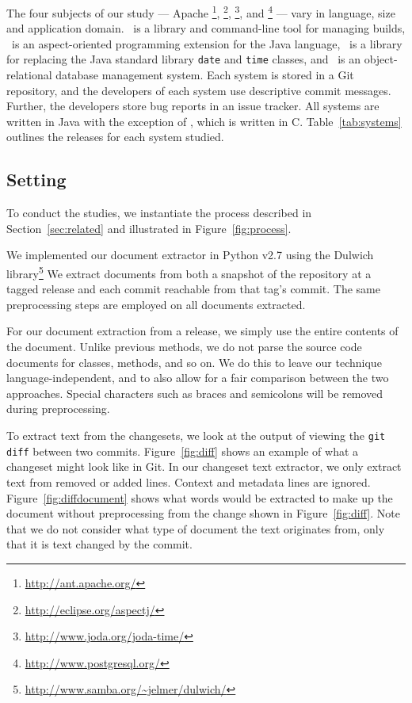 The four subjects of our study ---
Apache \ant\footnote{\url{http://ant.apache.org/}},
\aspectj\footnote{\url{http://eclipse.org/aspectj/}},
\jodatime\footnote{\url{http://www.joda.org/joda-time/}},
and \postgres\footnote{\url{http://www.postgresql.org/}}
--- vary in language, size and application domain.
\ant\ is a library and command-line tool for managing builds,
\aspectj\ is an aspect-oriented programming extension for the Java language,
\jodatime\ is a library for replacing the Java standard library \texttt{date} and \texttt{time} classes,
and \postgres\ is an object-relational database management system.
Each system is stored in a Git repository, and the developers of each system use descriptive commit messages.
Further, the developers store bug reports in an issue tracker.
All systems are written in Java with the exception of \postgres,
which is written in C. Table~\ref{tab:systems} outlines the releases for
each system studied.


\subsection{Setting}

To conduct the studies, we instantiate the process described in Section~\ref{sec:related} and illustrated in Figure~\ref{fig:process}.

We implemented our document extractor in Python v2.7
using the Dulwich library\footnote{\url{http://www.samba.org/~jelmer/dulwich/}} %
We extract documents from both a snapshot of the repository at a tagged
release and each commit reachable from that tag's commit.
The same preprocessing steps are employed on all documents extracted.

For our document extraction from a release,
we simply use the entire contents of the document.
Unlike previous methods, %
we do not parse the source code documents for classes, methods, and so on.
We do this to leave our technique language-independent,
and to also allow for a fair comparison between the two approaches.
Special characters such as braces and semicolons will be removed during
preprocessing.

To extract text from the changesets, we look at the output of viewing
the \texttt{git diff} between two commits.
Figure~\ref{fig:diff} shows an example of what a changeset might look
like in Git.
In our changeset text extractor, we only extract text from removed or added lines.
Context and metadata lines are ignored.
Figure~\ref{fig:diffdocument} shows what words would be extracted to make up the document without preprocessing
from the change shown in Figure~\ref{fig:diff}.
Note that we do not consider what type of document the text originates from,
only that it is text changed by the commit.

